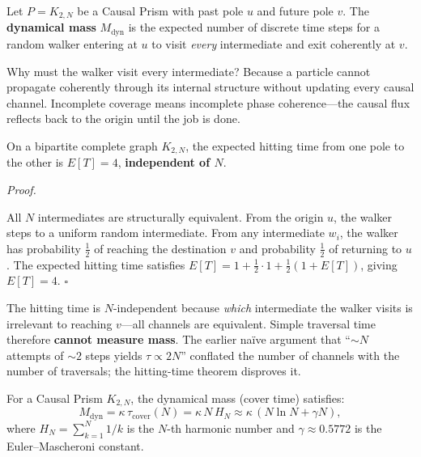 \documentclass[11pt, a4paper, openany]{book}
\newcounter{thm}[chapter]
\renewenvironment{proof}[1][Proof]{%
  \par\noindent\textit{#1.}\quad
}{\hfill$\square$\par\medskip}
\begin{document}
\begin{definition}\label{def:residence-time}
Let $P = K_{2,N}$ be a Causal Prism with past pole $u$ and future pole $v$. The \textbf{dynamical mass} $M_{\mathrm{dyn}}$ is the expected number of discrete time steps for a random walker entering at $u$ to visit \emph{every} intermediate and exit coherently at $v$.
\end{definition}

Why must the walker visit every intermediate?  Because a particle cannot propagate coherently through its internal structure without updating every causal channel.  Incomplete coverage means incomplete phase coherence---the causal flux reflects back to the origin until the job is done.

\begin{theorem}\label{thm:hitting-invariance}
On a bipartite complete graph $K_{2,N}$, the expected hitting time from one pole to the other is $E[T] = 4$, \textbf{independent of $N$}.
\end{theorem}

\begin{proof}
All $N$ intermediates are structurally equivalent.  From the origin $u$, the walker steps to a uniform random intermediate.  From any intermediate $w_i$, the walker has probability $\frac{1}{2}$ of reaching the destination $v$ and probability $\frac{1}{2}$ of returning to $u$.  The expected hitting time satisfies $E[T] = 1 + \frac{1}{2}\cdot 1 + \frac{1}{2}(1 + E[T])$, giving $E[T] = 4$.
\end{proof}

\noindent
The hitting time is $N$-independent because \emph{which} intermediate the walker visits is irrelevant to reaching $v$---all channels are equivalent.  Simple traversal time therefore \textbf{cannot measure mass}.  The earlier na\"ive argument that ``$\sim N$ attempts of $\sim 2$ steps yields $\tau \propto 2N$'' conflated the number of channels with the number of traversals; the hitting-time theorem disproves it.

\begin{theorem}\label{thm:residence}
For a Causal Prism $K_{2,N}$, the dynamical mass (cover time) satisfies:
\[
  M_{\mathrm{dyn}} = \kappa\,\tau_{\mathrm{cover}}(N) = \kappa\,N\,H_N
  \approx \kappa\,(N\ln N + \gamma N),
\]
where $H_N = \sum_{k=1}^{N} 1/k$ is the $N$-th harmonic number and $\gamma \approx 0.5772$ is the Euler--Mascheroni constant.
\end{theorem}
\end{document}
